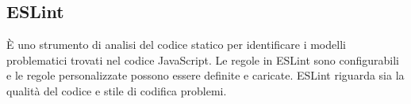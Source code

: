 \section{}
\subsection*{ESLint} È uno strumento di analisi del codice statico per identificare i modelli problematici trovati nel codice JavaScript. Le regole in ESLint sono configurabili e le regole personalizzate possono essere definite e caricate. ESLint riguarda sia la qualità del codice e stile di codifica problemi.
